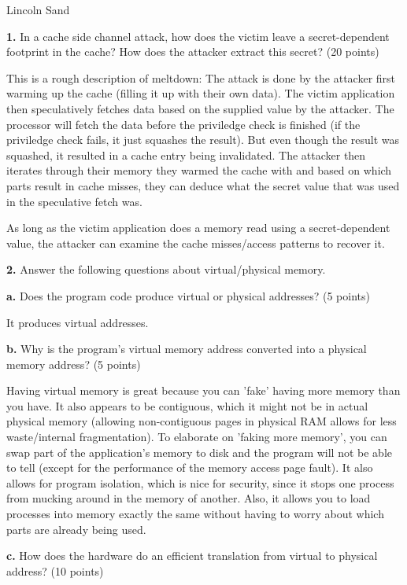 \documentclass{article}
\begin{document}
\Large{Lincoln Sand}


\textbf{1.}  In a cache side channel attack, how does the victim leave a
secret-dependent footprint in the cache? How does the attacker extract this secret? (20 points)

This is a rough description of meltdown: The attack is done by the attacker first warming up the cache
(filling it up with their own data).
The victim application then speculatively fetches data based on the supplied value by the attacker.
The processor will fetch the data before the priviledge check is finished
(if the priviledge check fails, it just squashes the result).
But even though the result was squashed, it resulted in a cache entry being invalidated.
The attacker then iterates through their memory they warmed the cache with and based on which
parts result in cache misses, they can deduce what the secret value that was used in the speculative fetch was.

As long as the victim application does a memory read using a secret-dependent value,
the attacker can examine the cache misses/access patterns to recover it.

\newpage

\textbf{2.}  Answer the following questions about virtual/physical memory.

\textbf{a.} Does the program code produce virtual or physical addresses? (5 points)

It produces virtual addresses.

\textbf{b.} Why is the program's virtual memory address converted into a physical memory address? (5 points)

Having virtual memory is great because you can 'fake' having more memory than you have. It also appears to
be contiguous, which it might not be in actual physical memory (allowing non-contiguous pages in physical RAM
allows for less waste/internal fragmentation).
To elaborate on 'faking more memory', you can swap part of the application's memory to disk and
the program will not be able to tell (except for the performance of the memory access page fault).
It also allows for program isolation, which is nice for security, since it stops one process
from mucking around in the memory of another.
Also, it allows you to load processes into memory exactly the same without having to worry about
which parts are already being used.

\textbf{c.} How does the hardware do an efficient translation from virtual to physical address? (10 points)
\end{document}
